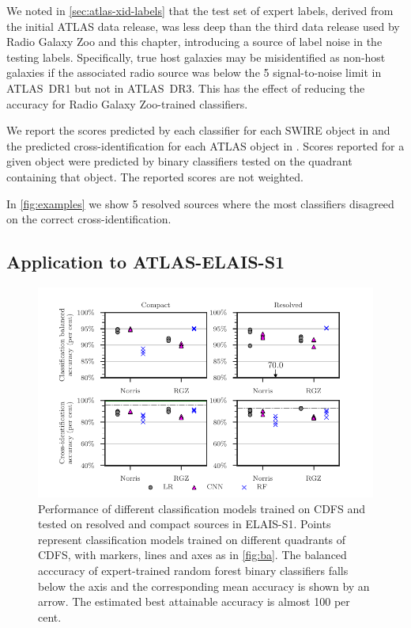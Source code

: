     We noted in \autoref{sec:atlas-xid-labels} that the test set of expert labels,
    derived from the initial ATLAS data release, was less deep than the third
    data release used by Radio Galaxy Zoo and this chapter, introducing a source
    of label noise in the testing labels. Specifically, true host galaxies may
    be misidentified as non-host galaxies if the associated radio source was
    below the 5 signal-to-noise limit in ATLAS~DR1 but not in ATLAS~DR3. This
    has the effect of reducing the accuracy for Radio Galaxy Zoo-trained
    classifiers.

    {We report the scores predicted by each classifier for each
    SWIRE object in  and the predicted
    cross-identification for each ATLAS object in .
    Scores reported for a given object were predicted by binary
    classifiers tested on the quadrant containing that object. The reported scores are not weighted.}

    In \autoref{fig:examples} we show 5 resolved sources where the most classifiers disagreed on the correct cross-identification.

\subsection{Application to ATLAS-ELAIS-S1}
  \label{sec:atlas-xid-elais}

  \begin{figure}
  \centering
  \includegraphics[]{atlas-images/elais-grid-new.pdf}
  \caption[Performance of different classification models on the binary classification task, tested on ELAIS-S1.]{Performance of different classification models trained on CDFS and tested on
  resolved and compact sources in ELAIS-S1. Points represent classification models
  trained on different quadrants of CDFS, with markers, lines and axes as in
  \autoref{fig:ba}. The balanced acccuracy of expert-trained random forest
  binary classifiers falls below the axis and the corresponding mean accuracy is
  shown by an arrow. The estimated best attainable accuracy is almost 100 per cent.
    \label{fig:elais-ba}}
  \end{figure}

